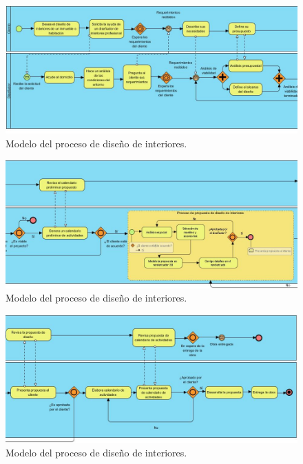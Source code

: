 \begin{figure}[!htbp]
	\centering
	\includegraphics[width=16cm]{imagenes/marcoteorico/diseno_01.jpg}
	\caption{Modelo del proceso de diseño de interiores.}
	\label{fig:bpmn_antes}
\end{figure}
\begin{figure}[!htbp]
\centering
\includegraphics[width=16cm]{imagenes/marcoteorico/diseno_02.jpg}
\caption{Modelo del proceso de diseño de interiores.}
\label{fig:bpmn_antes}
\end{figure}
\begin{figure}[!htbp]
\centering
\includegraphics[width=16cm]{imagenes/marcoteorico/diseno_03.jpg}
\caption{Modelo del proceso de diseño de interiores.}
\label{fig:bpmn_antes}
\end{figure}

